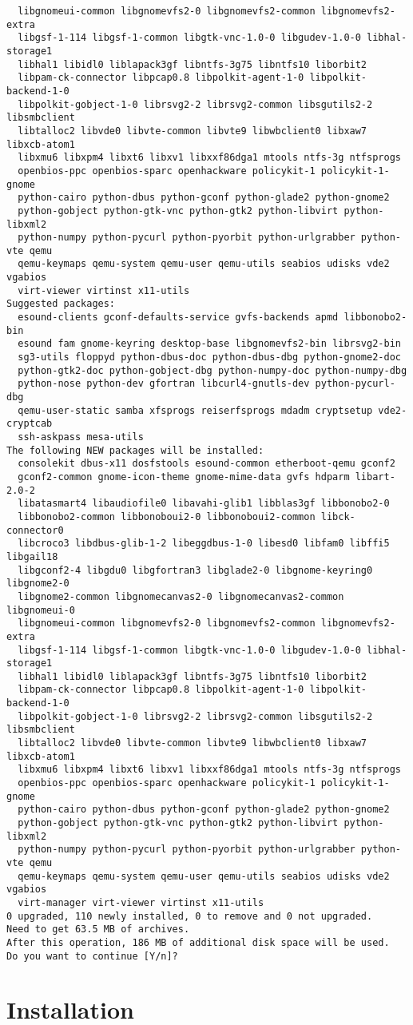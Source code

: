 \documentclass{article}
\begin{document}
\begin{lstlisting}
  libgnomeui-common libgnomevfs2-0 libgnomevfs2-common libgnomevfs2-extra
  libgsf-1-114 libgsf-1-common libgtk-vnc-1.0-0 libgudev-1.0-0 libhal-storage1
  libhal1 libidl0 liblapack3gf libntfs-3g75 libntfs10 liborbit2
  libpam-ck-connector libpcap0.8 libpolkit-agent-1-0 libpolkit-backend-1-0
  libpolkit-gobject-1-0 librsvg2-2 librsvg2-common libsgutils2-2 libsmbclient
  libtalloc2 libvde0 libvte-common libvte9 libwbclient0 libxaw7 libxcb-atom1
  libxmu6 libxpm4 libxt6 libxv1 libxxf86dga1 mtools ntfs-3g ntfsprogs
  openbios-ppc openbios-sparc openhackware policykit-1 policykit-1-gnome
  python-cairo python-dbus python-gconf python-glade2 python-gnome2
  python-gobject python-gtk-vnc python-gtk2 python-libvirt python-libxml2
  python-numpy python-pycurl python-pyorbit python-urlgrabber python-vte qemu
  qemu-keymaps qemu-system qemu-user qemu-utils seabios udisks vde2 vgabios
  virt-viewer virtinst x11-utils
Suggested packages:
  esound-clients gconf-defaults-service gvfs-backends apmd libbonobo2-bin
  esound fam gnome-keyring desktop-base libgnomevfs2-bin librsvg2-bin
  sg3-utils floppyd python-dbus-doc python-dbus-dbg python-gnome2-doc
  python-gtk2-doc python-gobject-dbg python-numpy-doc python-numpy-dbg
  python-nose python-dev gfortran libcurl4-gnutls-dev python-pycurl-dbg
  qemu-user-static samba xfsprogs reiserfsprogs mdadm cryptsetup vde2-cryptcab
  ssh-askpass mesa-utils
The following NEW packages will be installed:
  consolekit dbus-x11 dosfstools esound-common etherboot-qemu gconf2
  gconf2-common gnome-icon-theme gnome-mime-data gvfs hdparm libart-2.0-2
  libatasmart4 libaudiofile0 libavahi-glib1 libblas3gf libbonobo2-0
  libbonobo2-common libbonoboui2-0 libbonoboui2-common libck-connector0
  libcroco3 libdbus-glib-1-2 libeggdbus-1-0 libesd0 libfam0 libffi5 libgail18
  libgconf2-4 libgdu0 libgfortran3 libglade2-0 libgnome-keyring0 libgnome2-0
  libgnome2-common libgnomecanvas2-0 libgnomecanvas2-common libgnomeui-0
  libgnomeui-common libgnomevfs2-0 libgnomevfs2-common libgnomevfs2-extra
  libgsf-1-114 libgsf-1-common libgtk-vnc-1.0-0 libgudev-1.0-0 libhal-storage1
  libhal1 libidl0 liblapack3gf libntfs-3g75 libntfs10 liborbit2
  libpam-ck-connector libpcap0.8 libpolkit-agent-1-0 libpolkit-backend-1-0
  libpolkit-gobject-1-0 librsvg2-2 librsvg2-common libsgutils2-2 libsmbclient
  libtalloc2 libvde0 libvte-common libvte9 libwbclient0 libxaw7 libxcb-atom1
  libxmu6 libxpm4 libxt6 libxv1 libxxf86dga1 mtools ntfs-3g ntfsprogs
  openbios-ppc openbios-sparc openhackware policykit-1 policykit-1-gnome
  python-cairo python-dbus python-gconf python-glade2 python-gnome2
  python-gobject python-gtk-vnc python-gtk2 python-libvirt python-libxml2
  python-numpy python-pycurl python-pyorbit python-urlgrabber python-vte qemu
  qemu-keymaps qemu-system qemu-user qemu-utils seabios udisks vde2 vgabios
  virt-manager virt-viewer virtinst x11-utils
0 upgraded, 110 newly installed, 0 to remove and 0 not upgraded.
Need to get 63.5 MB of archives.
After this operation, 186 MB of additional disk space will be used.
Do you want to continue [Y/n]? 
\end{lstlisting}

\section{Installation}

\section{}
\end{document}
